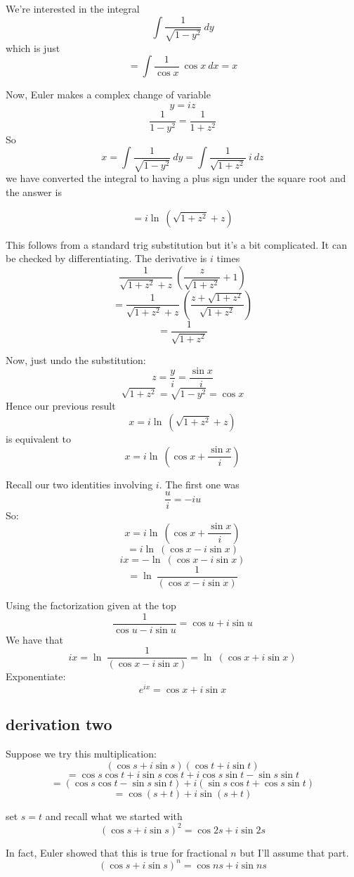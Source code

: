 \documentclass[11pt, oneside]{article}
\begin{document}
We're interested in the integral
\[ \int \frac{1}{\sqrt{1-y^2}} \ dy \]
which is just
\[ = \int \frac{1}{\cos x} \ \cos x \ dx = x \]

Now, Euler makes a complex change of variable
\[ y = iz \]
\[ \frac{1}{1-y^2} = \frac{1}{1+z^2} \]
So
\[ x = \int \frac{1}{\sqrt{1 - y^2}} \ dy = \int \frac{1}{\sqrt{1 + z^2}} \ i \ dz \]
we have converted the integral to having a plus sign under the square root and the answer is

\[ = i \ln \ (\sqrt{{1 + z^2}} + z) \]

This follows from a standard trig substitution but it's a bit complicated.  It can be checked by differentiating.  The derivative is $i$ times
\[ \frac{1}{\sqrt{1 + z^2} + z} \ (\frac{z}{ \sqrt{1+z^2}} + 1) \]
\[ = \frac{1}{\sqrt{1 + z^2} + z} \ (\frac{z + \sqrt{1+z^2}}{ \sqrt{1+z^2}}) \]
\[ = \frac{1}{\sqrt{1 + z^2}}  \]

Now, just undo the substitution:
\[ z = \frac{y}{i} = \frac{ \sin x}{i} \]
\[ \sqrt{1 + z^2} = \sqrt{1 - y^2} = \cos x \]
Hence our previous result
\[ x = i \ln \ (\sqrt{{1 + z^2}} + z) \]
is equivalent to
\[ x = i \ln \ (\cos x + \frac{\sin x}{i}) \]

Recall our two identities involving $i$.  The first one was
\[ \frac{u}{i} = - i u \]
So:
\[ x = i \ln \ (\cos x + \frac{\sin x}{i}) \]
\[ = i \ln \ (\cos x - i \sin x) \]
\[ ix = - \ln \ (\cos x - i \sin x) \]
\[ = \ln \ \frac{1}{(\cos x - i \sin x)} \]

Using the factorization given at the top
\[ \frac{1}{\cos u - i \sin u} = \cos u + i \sin u \]
We have that
\[ ix = \ln \ \frac{1}{(\cos x - i \sin x)}  = \ln \ (\cos x + i \sin x) \]
Exponentiate:
\[ e^{ix} = \cos x + i \sin x \]

\subsection*{derivation two}
Suppose we try this multiplication:
\[ (\cos s + i \sin s) (\cos t + i \sin t) \]
\[ = \cos s \cos t + i \sin s \cos t + i \cos s \sin t - \sin s \sin t \]
\[ = (\cos s \cos t - \sin s \sin t) + i (\sin s \cos t + \cos s \sin t) \]
\[ = \cos (s+t) + i \sin(s + t) \]

set $s=t$ and recall what we started with
\[ (\cos s + i \sin s)^2 = \cos 2s + i \sin 2s \]

In fact, Euler showed that this is true for fractional $n$ but I'll assume that part.
\[ (\cos s + i \sin s)^n = \cos ns  + i \sin ns \]
\end{document}
